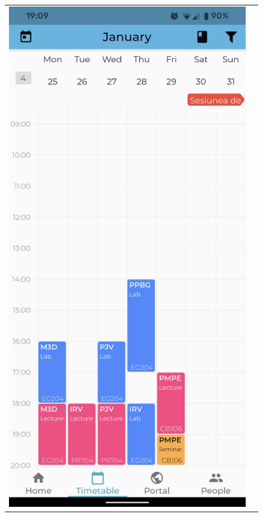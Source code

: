         \begin{figure}
            \begin{tabular}{@{}cc@{}}
                \begin{minipage}[b]{0.26\textwidth}
                    \includegraphics[width=\columnwidth]{figures/app/timetable.jpg}

\end{minipage}
\end{tabular}
\end{figure}
